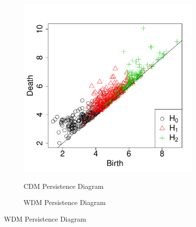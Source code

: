 \documentclass[12pt]{article}
\begin{document}
\begin{figure}[htp!]
  \centering
  \begin{subfigure}{0.45\textwidth}
    \caption{CDM Persistence Diagram}
    \includegraphics[width=\linewidth]{figure_11_cdm_pd.pdf}
    \label{fig:eagleDiagsC}
  \end{subfigure}
  \begin{subfigure}{0.45\textwidth}
    \caption{WDM Persistence Diagram}

\end{subfigure}
\end{figure}
\end{document}
